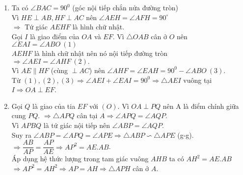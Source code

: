 \begin{ex}
{\begin{center}
\begin{tikzpicture}
    \end{tikzpicture}
	\end{center}    
    \begin{enumerate}
    \item Ta có $\angle BAC=90^0$ (góc nội tiếp chắn nửa đường tròn)\\
    Vì $HE \perp AB,HF \perp AC$ nên $\angle AEH=\angle AFH =90^{\circ}$\\
    $\Rightarrow $ Tứ giác $AEHF$ là hình chữ nhật.\\
    Gọi $I$ là giao điểm của $OA$ và $EF$. Vì $\triangle OAB$ cân ở $O$ nên $\angle EAI= \angle ABO ~(1)$\\
    $AEHF$ là hình chữ nhật nên nó nội tiếp đường tròn $\Rightarrow \angle AEI=\angle AHF~(2).$\\
    Vì $AE \parallel HF$ (cùng $\perp AC$) nên $\angle AHF =\angle EAH =90^0-\angle ABO~(3)$.\\
    Từ $(1),(2),(3) \Rightarrow \angle AEI +\angle EAI =90^0 \Rightarrow \triangle AEI$ vuông tại $I \Rightarrow OA \perp EF$.
    \item Gọi $Q$ là giao của tia $EF$ với $(O)$. Vì $OA \perp PQ$ nên A là điểm chính giữa cung $PQ$.
    $\Rightarrow \triangle APQ$ cân tại $A \Rightarrow \angle APQ=\angle AQP$.\\
    Vì $APBQ$ là tứ giác nội tiếp nên $\angle ABP =\angle AQP$.\\
    Suy ra $\angle ABP =\angle APQ =\angle APE \Rightarrow \triangle ABP \backsim \triangle APE$ (g-g).\\
    $\Rightarrow \dfrac{AB}{AP}=\dfrac{AP}{AE}\Rightarrow AP^2=AE.AB$.\\
    Áp dụng hệ thức lượng trong tam giác vuông $AHB$ ta có $AH^2=AE.AB$\\
    $\Rightarrow AP^2=AH^2 \Rightarrow AP=AH \Rightarrow \triangle APH$ cân ở $A$.
    \end{enumerate}
    }
\end{ex}

